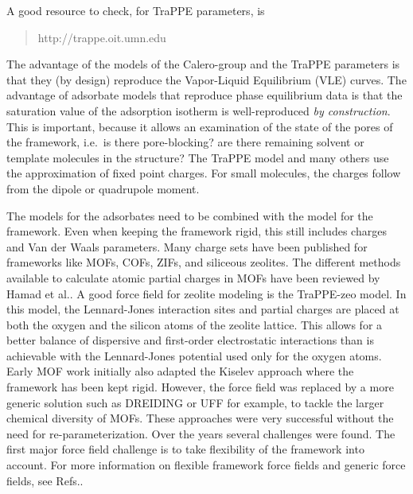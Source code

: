 \noindent
A good resource to check, for TraPPE parameters, is 
\begin{quote}
http://trappe.oit.umn.edu
\end{quote}
The advantage of the models of the Calero-group and the TraPPE parameters is that they (by design) reproduce the Vapor-Liquid Equilibrium (VLE) curves.
The advantage of adsorbate models that reproduce phase equilibrium data is that the saturation value of the adsorption
isotherm is well-reproduced \emph{by construction}. This is important, because it allows an examination of the
state of the pores of the framework, i.e.\ is there pore-blocking? are there remaining solvent or template molecules in the structure?
The TraPPE model and many others use the approximation of fixed point charges.
For small molecules, the charges follow from the dipole or quadrupole moment.

The models for the adsorbates need to be combined with the model for the framework.
Even when keeping the framework rigid, this still includes charges and Van der Waals parameters.
Many charge sets have been published for frameworks like
MOFs\cite{Xu2010,Parkes2013,Nazarian2016},
COFs\cite{Zheng2010},
ZIFs\cite{Rana2011,GutierrezSevillano2013b},
and siliceous zeolites\cite{Wolffis2019}.
The different methods available to calculate atomic partial charges in MOFs have been reviewed by Hamad et al.\cite{Hamad2015}.
A good force field for zeolite modeling is the TraPPE-zeo model\cite{Bai2013}. In this model, the
Lennard-Jones interaction sites and partial charges are placed at both the oxygen and the silicon atoms of the zeolite lattice.
This allows for a better balance of dispersive and first-order electrostatic interactions than is
achievable with the Lennard-Jones potential used only for the oxygen atoms.
Early MOF work initially also adapted the Kiselev approach where the framework has been kept rigid. However, the force field was replaced by a more generic
solution such as DREIDING\cite{Mayo1990} or UFF\cite{Rappe1992} for example, to tackle the larger chemical diversity of MOFs. These approaches were very
successful without the need for re-parameterization\cite{Duren2004, Sarkisov2004, DurenSnurr2004, SarkisovDurenSnurr2004}.
Over the years several challenges were found. The first major force field challenge is to take flexibility
of the framework into account. For more information on flexible framework force fields and generic force fields, see Refs.\cite{Heinen2018,Dubbeldam2019}.

